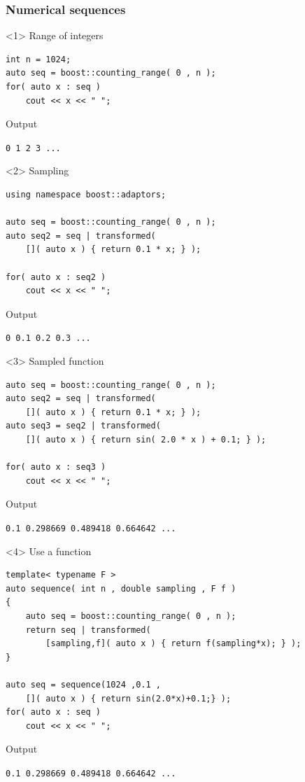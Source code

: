 \documentclass{beamer}
\newcommand{\heading}[1]{\frametitle{#1}}
\begin{document}
\begin{frame}[fragile]
 \heading{Numerical sequences}
 
 \begin{onlyenv}<1>
Range of integers
\begin{lstlisting}[basicstyle=\scriptsize\ttfamily]
int n = 1024;
auto seq = boost::counting_range( 0 , n );
for( auto x : seq )
    cout << x << " ";
\end{lstlisting}
\vspace{2ex}Output

\vspace{0.5ex}\lstinline$0 1 2 3 ...$
 \end{onlyenv}
  \begin{onlyenv}<2>
Sampling
\begin{lstlisting}[basicstyle=\scriptsize\ttfamily]
using namespace boost::adaptors;

auto seq = boost::counting_range( 0 , n );
auto seq2 = seq | transformed(
    []( auto x ) { return 0.1 * x; } );

for( auto x : seq2 )
    cout << x << " ";
\end{lstlisting}
\vspace{2ex}Output

\vspace{0.5ex}\lstinline$0 0.1 0.2 0.3 ...$
 \end{onlyenv}
  \begin{onlyenv}<3>
Sampled function
\begin{lstlisting}[basicstyle=\scriptsize\ttfamily]
auto seq = boost::counting_range( 0 , n );
auto seq2 = seq | transformed(
    []( auto x ) { return 0.1 * x; } );
auto seq3 = seq2 | transformed(
    []( auto x ) { return sin( 2.0 * x ) + 0.1; } );

for( auto x : seq3 )
    cout << x << " ";
\end{lstlisting}
\vspace{2ex}Output

\vspace{0.5ex}\lstinline$0.1 0.298669 0.489418 0.664642 ...$
 \end{onlyenv}
  \begin{onlyenv}<4>
Use a function
\begin{lstlisting}[basicstyle=\scriptsize\ttfamily]
template< typename F >
auto sequence( int n , double sampling , F f )
{
    auto seq = boost::counting_range( 0 , n );
    return seq | transformed(
        [sampling,f]( auto x ) { return f(sampling*x); } );
}

auto seq = sequence(1024 ,0.1 ,
    []( auto x ) { return sin(2.0*x)+0.1;} );
for( auto x : seq )
    cout << x << " ";
\end{lstlisting}
\vspace{2ex}Output

\vspace{0.5ex}\lstinline$0.1 0.298669 0.489418 0.664642 ...$
 \end{onlyenv}
\end{frame}
\end{document}
